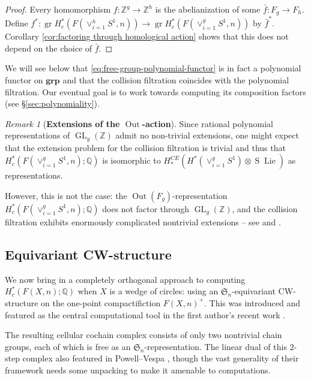 \documentclass[12pt]{article}
\newcommand{\Q}{\mathbb{Q}}
\newcommand{\SymGroup}[1][n]{\mathfrak{S}_{#1}}
\DeclareMathOperator{\GL}{GL}
\DeclareMathOperator{\gr}{gr}
\DeclareMathOperator{\Lie}{Lie}
\DeclareMathOperator{\Out}{Out}
\DeclareMathOperator{\Suspension}{S}
\theoremstyle{plain}
\theoremstyle{definition}
\theoremstyle{remark}
\newtheorem{rmk}[thm]{Remark}
\begin{document}
\begin{proof}
    Every homomorphism $f:\mathbb{Z}^g\to \mathbb{Z}^h$ is the abelianization of some $\bar{f}:F_g\to F_h$. Define $f^*: \gr H^*_c( F(\vee_{i=1}^h S^1,n))\to \gr H^*_c( F(\vee_{i=1}^g S^1,n))$ by $\bar{f}^*$.
    Corollary \ref{cor:factoring through homological action} shows that this does not depend on the choice of $\bar{f}$.
\end{proof}
We will see below that \eqref{eq:free-group-polynomial-functor} is in fact a polynomial functor on $\mathbf{grp}$ and that the collision filtration coincides with the polynomial filtration. Our eventual goal is to work towards computing its composition factors (see \S\ref{sec:polynomiality}).

\begin{rmk}[\textbf{Extensions of the $\Out$-action}]\label{rmk:extensions}
   Since rational polynomial representations of $\GL_g(\mathbb{Z})$ admit no non-trivial extensions, one might expect that the extension problem for the collision filtration is trivial and thus that $H^*_c( F(\vee_{i=1}^g S^1,n) ; \mathbb{Q})$ is isomorphic to $H^{CE}_*(H^*(\vee_{i=1}^g S^1)\otimes \Suspension \Lie)$ as representations.
   
   However, this is not the case: the $\Out(F_g)$-representation $H^*_c( F(\vee_{i=1}^g S^1,n) ; \mathbb{Q})$ does not factor through $\GL_g(\mathbb{Z})$, and the collision filtration exhibits enormously complicated nontrivial extensions -- see \cite[\S2.3]{TW19} and \cite[Theorem 13]{PV18}.
\end{rmk}

\subsection{Equivariant CW-structure}\label{section:2-step}
We now bring in a completely orthogonal approach to computing $H^*_c(F(X,n);\Q)$ when $X$ is a wedge of circles: using an $\SymGroup[n]$-equivariant CW-structure on the one-point compactifiction $F(X,n)^+$.
This was introduced and featured as the central computational tool in the first author's recent work \cite{BCGY21}.

The resulting cellular cochain complex consists of only two nontrivial chain groups, each of which is free as an $\SymGroup[n]$-representation. The linear dual of this $2$-step complex also featured in Powell--Vespa \cite{PV18}, though the vast generality of their framework needs some unpacking to make it amenable to computations.
\end{document}

